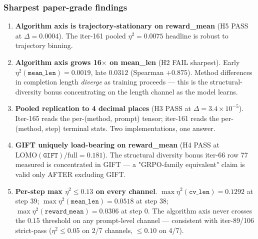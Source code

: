 \documentclass{article}  \usepackage[preprint,nonatbib]{neurips_2026} \usepackage[numbers]{natbib}
\begin{document}
\subsubsection{Sharpest paper-grade findings}
\begin{enumerate}
\item \textbf{Algorithm axis is trajectory-stationary on reward\_mean} (H5 PASS at $\Delta{=}0.0004$). The iter-161 pooled $\eta^2{=}0.0075$ headline is robust to trajectory binning.
\item \textbf{Algorithm axis grows 16$\times$ on mean\_len} (H2 FAIL sharpest). Early $\eta^2(\texttt{mean\_len}){=}0.0019$, late $0.0312$ (Spearman $+0.875$). Method differences in completion length \emph{diverge} as training proceeds --- this is the structural-diversity bonus concentrating on the length channel as the model learns.
\item \textbf{Pooled replication to 4 decimal places} (H3 PASS at $\Delta{=}3.4 \times 10^{-5}$). Iter-165 reads the per-(method, prompt) tensor; iter-161 reads the per-(method, step) terminal stats. Two implementations, one answer.
\item \textbf{GIFT uniquely load-bearing on reward\_mean} (H4 PASS at $\mathrm{LOMO}(\texttt{GIFT})/\mathrm{full} = 0.181$). The structural diversity bonus iter-66 row 77 measured is concentrated in GIFT --- a "GRPO-family equivalent" claim is valid only AFTER excluding GIFT.
\item \textbf{Per-step max $\eta^2 \le 0.13$ on every channel}. $\max \eta^2(\texttt{cv\_len}){=}0.1292$ at step 39; $\max \eta^2(\texttt{mean\_len}){=}0.0518$ at step 38; $\max \eta^2(\texttt{reward\_mean}){=}0.0306$ at step 0. The algorithm axis never crosses the $0.15$ threshold on any prompt-level channel --- consistent with iter-89/106 strict-pass ($\eta^2 \le 0.05$ on 2/7 channels, $\le 0.10$ on 4/7).
\end{enumerate}
\end{document}
